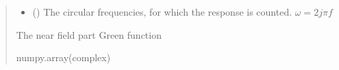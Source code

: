 \documentclass[letterpaper,10pt,english]{sphinxmanual}
\begin{document}
\begin{fulllineitems}
\begin{quote}
\begin{description}
\begin{itemize}
\item {} 
\sphinxAtStartPar
{} (\sphinxstyleliteralemphasis{\sphinxupquote{(}}\sphinxstyleliteralemphasis{\sphinxupquote{)}}) \textendash{} The circular frequencies, for which the response is counted. \(\omega = 2j\pi f\)

\end{itemize}

\sphinxAtStartPar
The near field part Green function

\sphinxAtStartPar
numpy.array(complex)

\end{description}\end{quote}

\end{fulllineitems}

\end{document}
